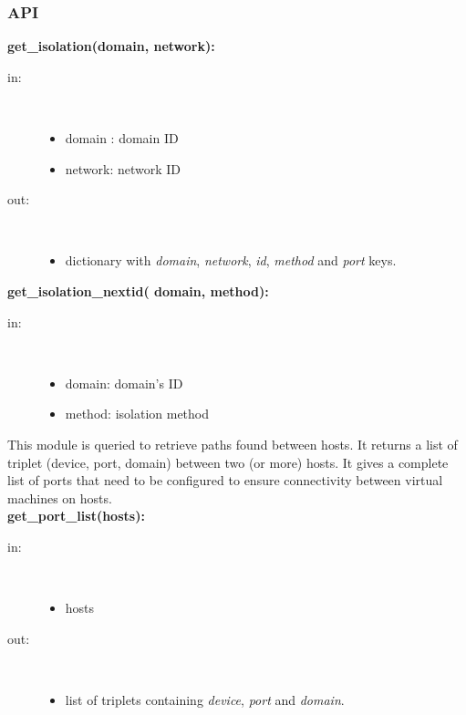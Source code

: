 \subsubsection{API}
\textbf{get\_isolation(domain, network):}
\begin{description}
    \item[in:] \hfill \\
        \begin{itemize}
            \item domain : domain ID
            \item network: network ID
        \end{itemize}
    \item[out:] \hfill \\
        \begin{itemize}
            \item dictionary with \emph{domain}, \emph{network}, \emph{id}, \emph{method} and \emph{port} keys.
        \end{itemize}
\end{description}
\textbf{get\_isolation\_nextid( domain, method):}
\begin{description}
    \item[in:] \hfill \\
        \begin{itemize}
            \item domain: domain’s ID
            \item method: isolation method
        \end{itemize}
\end{description}
This module is queried to retrieve paths found between hosts. It returns a list of triplet (device, port, domain) between two (or more) hosts. It gives a complete list of ports that need to be configured to ensure connectivity between virtual machines on hosts.\\[1\baselineskip]
\textbf{get\_port\_list(hosts):}
\begin{description}
    \item[in:] \hfill \\
        \begin{itemize}
            \item hosts
        \end{itemize}
    \item[out:] \hfill \\
        \begin{itemize}
            \item list of triplets containing \emph{device}, \emph{port} and \emph{domain}.
        \end{itemize}
\end{description}
